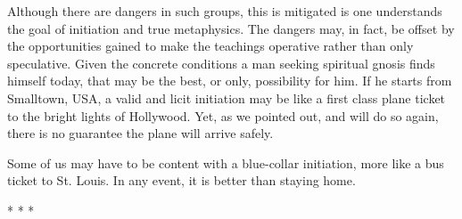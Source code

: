 Although there are dangers in such groups, this is mitigated is one understands the goal of initiation and true metaphysics. The dangers may, in fact, be offset by the opportunities gained to make the teachings operative rather than only speculative. Given the concrete conditions a man seeking spiritual gnosis finds himself today, that may be the best, or only, possibility for him. If he starts from Smalltown, USA, a valid and licit initiation may be like a first class plane ticket to the bright lights of Hollywood. Yet, as we pointed out, and will do so again, there is no guarantee the plane will arrive safely.

Some of us may have to be content with a blue-collar initiation, more like a bus ticket to St. Louis. In any event, it is better than staying home.


\begin{center}* * *\end{center}

